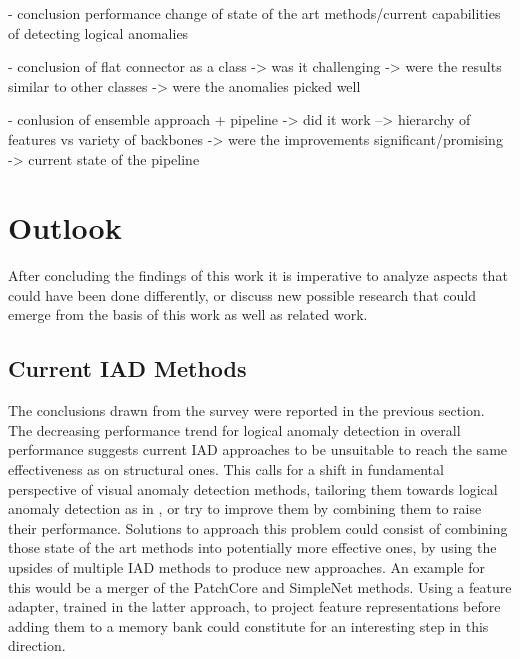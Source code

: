 - conclusion performance change of state of the art methods/current capabilities of detecting logical anomalies\newline

- conclusion of flat connector as a class\newline
-> was it challenging\newline
-> were the results similar to other classes\newline
-> were the anomalies picked well%

- conlusion of ensemble approach + pipeline\newline
-> did it work\newline
--> hierarchy of features vs variety of backbones\newline
-> were the improvements significant/promising\newline
-> current state of the pipeline\newline




\section{Outlook}
\label{sec:finaloutlook}

After concluding the findings of this work it is imperative to analyze aspects that could have been done differently, or discuss new possible research that could emerge from 
the basis of this work as well as related work.\newline

\subsection{Current IAD Methods}
The conclusions drawn from the survey were reported in the previous section. The decreasing performance trend for logical anomaly detection in overall performance suggests 
current IAD approaches to be unsuitable to reach the same effectiveness as on structural ones. This calls for a shift in fundamental perspective of visual anomaly 
detection methods, tailoring them towards logical anomaly detection as in \cite{LOCODentsAndScratchesBergmann2022}, or try to improve them by combining them to raise their 
performance. Solutions to approach this problem could consist of combining 
those state of the art methods into potentially more effective ones, by using the upsides of multiple IAD methods to produce new approaches. An example for this would be a 
merger of the PatchCore \cite{patchCore2022} and SimpleNet \cite{liu2023simplenet} methods. Using a feature adapter, trained in the latter approach, to project feature 
representations before adding them to a memory bank could constitute for an interesting step in this direction. 

